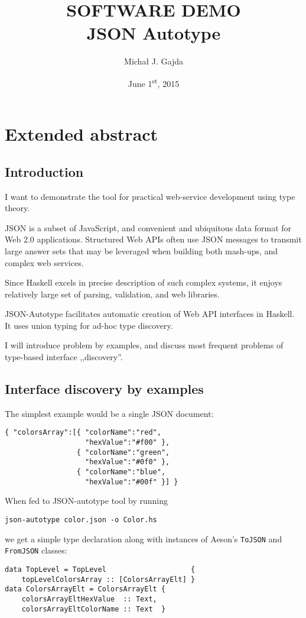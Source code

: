 \documentclass[11pt]{article}
\title{\textbf{{\large SOFTWARE DEMO}\\JSON Autotype\\
\vspace{5pt}{\large
Automatic bridge from untyped Web APIs
\\to typeful haven of Haskell}}}
\author{Micha\l{} J. Gajda}
\date{June 1\textsuperscript{st}, 2015}
\begin{document}
\maketitle

\section*{Extended abstract}
\subsection*{Introduction}
I want to demonstrate the tool for practical web-service development using type theory.

JSON is a subset of JavaScript, and convenient and ubiquitous data format for Web 2.0 applications. Structured Web APIs often use JSON messages to transmit large answer sets that may be leveraged when building both mash-ups, and complex web services.

Since Haskell excels in precise description of such complex systems, it enjoys relatively large set of parsing, validation, and web libraries.

JSON-Autotype facilitates automatic creation of Web API interfaces in Haskell. It uses union typing for ad-hoc type discovery.

I will introduce problem by examples, and discuss most frequent problems of type-based interface ,,discovery''.

\subsection*{Interface discovery by examples}

The simplest example would be a single JSON document:

\begin{verbatim}
{ "colorsArray":[{ "colorName":"red",
                   "hexValue":"#f00" },
                 { "colorName":"green",
                   "hexValue":"#0f0" },
                 { "colorName":"blue",
                   "hexValue":"#00f" }] }
\end{verbatim}

When fed to JSON-autotype tool by running \begin{verbatim}json-autotype color.json -o Color.hs\end{verbatim} we get a simple type declaration along with instances of Aeson's \texttt{ToJSON} and \texttt{FromJSON} classes:

\begin{verbatim}
data TopLevel = TopLevel                    { 
    topLevelColorsArray :: [ColorsArrayElt] }
data ColorsArrayElt = ColorsArrayElt { 
    colorsArrayEltHexValue  :: Text,
    colorsArrayEltColorName :: Text  }
\end{verbatim}
\end{document}
